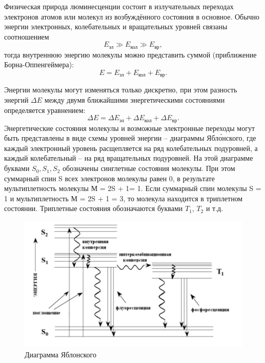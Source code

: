 \documentclass[a4paper,12pt]{article}
\begin{document}
Физическая природа люминесценции состоит в излучательных переходах электронов атомов
или молекул из возбуждённого состояния в основное. Обычно энергии электронных,
колебательных и вращательных уровней связаны соотношением 
\begin{equation}
    E_\text{эл} \gg E_\text{кол} \gg E_\text{вр},
\end{equation}
тогда внутреннюю энергию молекулы можно представить суммой (приближение Борна-Оппенгеймера):
\begin{equation}
    E = E_\text{эл} + E_\text{кол} + E_\text{вр}.
\end{equation}

Энергии молекулы могут изменяться только дискретно, при этом разность энергий $\Delta E$ между двумя ближайшими энергетическими состояниями определяется
уравнением:
\begin{equation}
    \Delta E = \Delta E_\text{эл} + \Delta E_\text{кол} + \Delta E_\text{вр}.
\end{equation}
Энергетические состояния молекулы и возможные электронные переходы могут быть представлены в виде схемы уровней энергии – диаграммы Ябло́нского, где каждый
электронный уровень расщепляется на ряд колебательных подуровней, а каждый
колебательный – на ряд вращательных подуровней. На этой диаграмме буквами $S_0,
S_1, S_2$ обозначены синглетные состояния молекулы. При этом суммарный спин S всех
электронов молекулы равен 0, в результате мультиплетность молекулы М = 2S + 1= 1. Если
суммарный спин молекулы S = 1 и мультиплетность М = 2S + 1 = 3, то молекула находится в
триплетном состоянии. Триплетные состояния обозначаются буквами $T_1$, $T_2$ и т.д. 
\begin{figure}
    \centering
    \includegraphics[scale=0.8]{yabl.jpg}
    \caption{Диаграмма Яблонского}
\end{figure}
\end{document}
